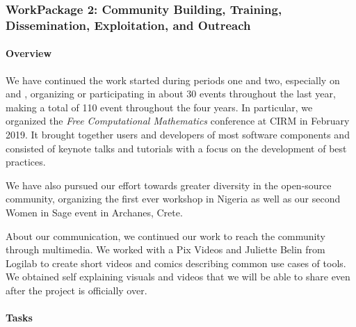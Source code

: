 \subsubsection{WorkPackage 2:  Community Building, Training, Dissemination, Exploitation, and Outreach}
\label{dissem}



\paragraph{Overview}

  We have continued the work started during periods one and two, especially on  and
  , organizing or participating in about 30 events throughout the last year, making a total of 110 event throughout the four years. In particular, we organized the \emph{Free Computational Mathematics} 
  conference at CIRM in February 2019. It brought together users and developers of most \ODK software components and consisted of keynote talks and tutorials with a focus on the development of best practices.
  
  
  We have also pursued our effort towards greater diversity in the open-source community, organizing the first ever \Sage workshop in Nigeria as well as our second Women in Sage event in Archanes, Crete.


  About our communication, we continued our work to reach the community through multimedia. We worked with a Pix Videos and Juliette Belin from Logilab to create short videos and comics describing common use cases of \ODK tools. We obtained self explaining visuals and videos that we will be able to share even after the project is officially over.


\paragraph{Tasks}

